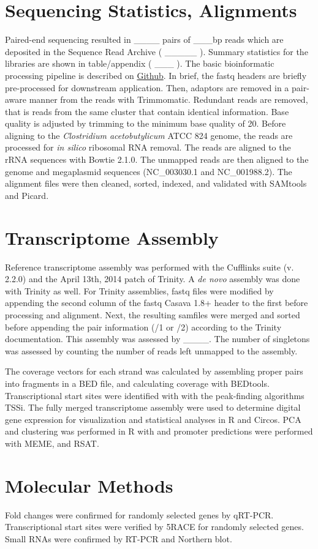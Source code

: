 \section{Sequencing Statistics, Alignments}
Paired-end sequencing resulted in ____ pairs of ___bp reads which are deposited in the Sequence Read Archive ( _____ ). Summary statistics for the libraries are shown in table/appendix ( ___ ). The basic bioinformatic processing pipeline is described on \href{https://github.com/mrals89/NGS_scripts/tree/paired}{Github}. In brief, the fastq headers are briefly pre-processed for downstream application. Then, adaptors are removed in a pair-aware manner from the reads with Trimmomatic. Redundant reads are removed, that is reads from the same cluster that contain identical information. Base quality is adjusted by trimming to the minimum base quality of 20. Before aligning to the \textit{Clostridium acetobutylicum} ATCC 824 genome, the reads are processed for \textit{in silico} ribosomal RNA removal. The reads are aligned to the rRNA sequences with Bowtie 2.1.0. The unmapped reads are then aligned to the genome and megaplasmid sequences (NC_003030.1 and NC_001988.2). The alignment files were then cleaned, sorted, indexed, and validated with SAMtools and Picard.

\section{Transcriptome Assembly}
Reference transcriptome assembly was performed with the Cufflinks suite (v. 2.2.0) and the April 13th, 2014 patch of Trinity. A \textit{de novo} assembly was done with Trinity as well. For Trinity assemblies, fastq files were modified by appending the second column of the fastq Casava 1.8+ header to the first before processing and alignment. Next, the resulting samfiles were merged and sorted before appending the pair information (/1 or /2) according to the Trinity documentation. This assembly was assessed by ____. The number of singletons was assessed by counting the number of reads left unmapped to the assembly.

The coverage vectors for each strand was calculated by assembling proper pairs into fragments in a BED file, and calculating coverage with BEDtools. Transcriptional start sites were identified with with the peak-finding algorithms TSSi. The fully merged transcriptome assembly were used to determine digital gene expression for visualization and statistical analyses in R and Circos. PCA and clustering was performed in R with          and promoter predictions were performed with MEME, and RSAT.
\section{Molecular Methods}
Fold changes were confirmed for randomly selected genes by qRT-PCR. Transcriptional start sites were verified by 5\textprime  RACE for randomly selected genes. Small RNAs were confirmed by RT-PCR and Northern blot.
